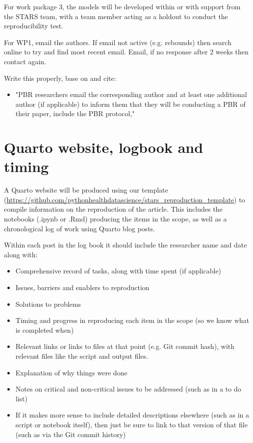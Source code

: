 For work package 3, the models will be developed within or with support from the STARS team, with a team member acting as a holdout to conduct the reproducibility test.

For WP1, email the authors. If email not active (e.g. rebounds) then search online to try and find most recent email. Email, if no response after 2 weeks then contact again.

Write this properly, base on and cite:
\begin{itemize}
    \item "PBR researchers email the corresponding author and at least one additional author (if applicable) to inform them that they will be conducting a PBR of their paper, include the PBR protocol,"\autocite{berkeley_initiative_for_transparency_in_the_social_sciences_guide_2022}
\end{itemize}

\section{Quarto website, logbook and timing}

A Quarto website will be produced using our template (\url{https://github.com/pythonhealthdatascience/stars_reproduction_template}) to compile information on the reproduction of the article. This includes the notebooks (.ipynb or .Rmd) producing the items in the scope, as well as a chronological log of work using Quarto blog posts.

Within each post in the log book it should include the researcher name and date along with:
\begin{itemize}
    \item Comprehensive record of tasks, along with time spent (if applicable)
    \item Issues, barriers and enablers to reproduction
    \item Solutions to problems
    \item Timing and progress in reproducing each item in the scope (so we know what is completed when)
    \item Relevant links or links to files at that point (e.g. Git commit hash), with relevant files like the script and output files.
    \item Explanation of why things were done
    \item Notes on critical and non-critical issues to be addressed (such as in a to do list)
    \item If it makes more sense to include detailed descriptions elsewhere (such as in a script or notebook itself), then just be sure to link to that version of that file (such as via the Git commit history)
\end{itemize}

